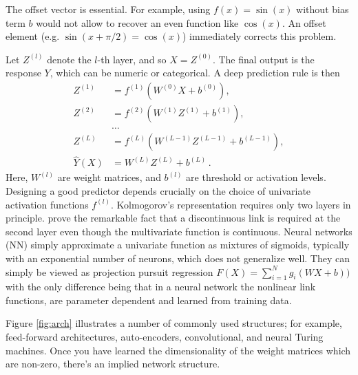 \documentclass[12pt]{article}
\begin{document}
The offset vector is essential. For example, using $f(x) = \sin(x)$ without bias term $b$ would not allow to recover an even function like $\cos(x)$. An offset element (e.g. $\sin(x+ \pi/2) = \cos(x)$) immediately corrects this problem.

Let $ Z^{(l)} $ denote the $l$-th layer, and so $ X = Z^{(0)}$.
The final output is the response $Y$, which can be numeric or categorical.
A deep prediction rule is then
\begin{align*}
Z^{(1)} & = f^{(1)} \left ( W^{(0)} X + b^{(0)} \right ),\\
Z^{(2)} & = f^{(2)} \left ( W^{(1)} Z^{(1)} + b^{(1)} \right ),\\
  & \ldots\\
Z^{(L)} & = f^{(L)} \left ( W^{(L-1)} Z^{(L-1)} + b^{(L-1)} \right ),\\
\hat{Y} (X) & = W^{(L)} Z^{(L)} + b^{(L)}\,.
\end{align*}
Here, $W^{(l)} $ are weight matrices, and $b^{(l)} $ are threshold or activation levels.
Designing a good predictor depends crucially on the choice of univariate activation functions $ f^{(l)} $.
Kolmogorov's representation requires only two layers in principle. 
\cite{vitushkin_linear_1967} prove the remarkable fact that a discontinuous link is required at the second layer even though the multivariate function is continuous. 
Neural networks (NN) simply approximate a univariate function as mixtures of sigmoids, typically with an exponential number of neurons, which does not generalize well.
They can simply be viewed as projection pursuit regression $F(X) = \sum_{i=1}^N g_i ( W X + b ) )$ with the only difference being that in a neural network the nonlinear link functions, are parameter dependent and learned from training data.

Figure \ref{fig:arch} illustrates a number of commonly used structures; for example, feed-forward architectures, auto-encoders, convolutional, and neural Turing machines. Once you have learned the dimensionality of the weight matrices which are non-zero, there's an implied network structure. 
\end{document}
